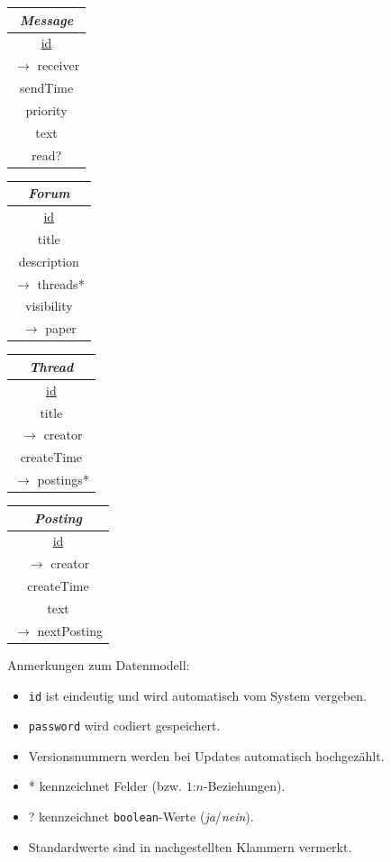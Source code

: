 \documentclass[headexclude,footexclude,12pt,BCOR0pt,DIV15]{scrartcl}
\begin{document}
\begin{center}
    \begin{tabular}{|c|}
      \hline
      \emph{Message} \\
      \hline
      \underline{id} \\
      $\longrightarrow$ receiver \\
      sendTime \\
      priority \\
      text \\
      read? \\
      \hline
    \end{tabular}
    \begin{tabular}{|c|}
      \hline
      \emph{Forum} \\
      \hline
      \underline{id} \\
      title \\
      description \\
      $\longrightarrow$ threads* \\
      visibility \\
      $\longrightarrow$ paper \\
      \hline
    \end{tabular}
    \begin{tabular}{|c|}
      \hline
      \emph{Thread} \\
      \hline
      \underline{id} \\
      title \\
      $\longrightarrow$ creator \\
      createTime \\
      $\longrightarrow$ postings* \\
      \hline
    \end{tabular}
    \begin{tabular}{|c|}
      \hline
      \emph{Posting} \\
      \hline
      \underline{id} \\
      $\longrightarrow$ creator \\
      createTime \\
      text \\
      $\longrightarrow$ nextPosting \\
      \hline
    \end{tabular}
\end{center}
\pagebreak
        Anmerkungen zum Datenmodell:
        \begin{itemize}
            \item \texttt{id} ist eindeutig und wird automatisch vom System vergeben.
            \item \texttt{password} wird codiert gespeichert.
            \item Versionsnummern werden bei Updates automatisch hochgez\"{a}hlt.
            \item * kennzeichnet Felder (bzw. $1$:$n$-Beziehungen).
            \item ? kennzeichnet \texttt{boolean}-Werte (\textit{ja}/\textit{nein}).
            \item Standardwerte sind in nachgestellten Klammern vermerkt.
        \end{itemize}
\end{document}
